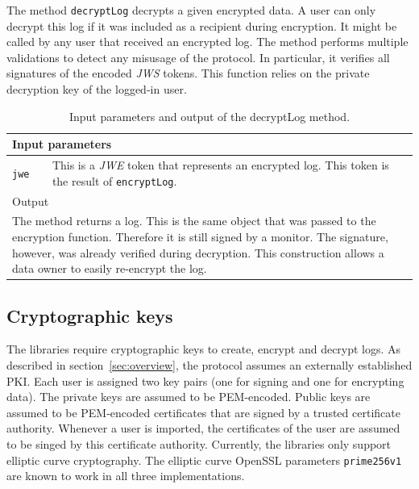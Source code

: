 \documentclass[../main.tex]{subfiles}
\begin{document}
The method \verb|decryptLog| decrypts a given encrypted data.
A user can only decrypt this log if it was included as a recipient during encryption.
It might be called by any user that received an encrypted log.
The method performs multiple validations to detect any misusage of the protocol.
In particular, it verifies all signatures of the encoded \emph{JWS} tokens.
This function relies on the private decryption key of the logged-in user.
\begin{table}[ht]
    \centering
    \begin{tabular}{|p{3cm}p{10cm}|}
        \hline
        \multicolumn{2}{|l|}{Input parameters}    \\ \hline
        \verb|jwe|              & This is a \emph{JWE} token that represents an encrypted log. This token is the result of \verb|encryptLog|. \\ \hline
            \multicolumn{2}{|l|}{Output}   \\ \hline
        \multicolumn{2}{|p{13cm}|}{The method returns a log. This is the same object that was passed to the encryption function. Therefore it is still signed by a monitor. The signature, however, was already verified during decryption. This construction allows a data owner to easily re-encrypt the log.} \\ \hline
    \end{tabular}
    \caption[Signature of decryptLog]{Input parameters and output of the decryptLog method.}
\end{table}

\subsection{Cryptographic keys}
The libraries require cryptographic keys to create, encrypt and decrypt logs.
As described in section~\ref{sec:overview}, the protocol assumes an externally established PKI.
Each user is assigned two key pairs (one for signing and one for encrypting data).
The private keys are assumed to be PEM-encoded.
Public keys are assumed to be PEM-encoded certificates that are signed by a trusted certificate authority.
Whenever a user is imported, the certificates of the user are assumed to be singed by this certificate authority.
Currently, the libraries only support elliptic curve cryptography.
The elliptic curve OpenSSL parameters \verb|prime256v1| are known to work in all three implementations.
\end{document}
